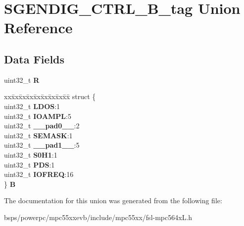 \hypertarget{unionSGENDIG__CTRL__32B__tag}{}\section{S\+G\+E\+N\+D\+I\+G\+\_\+\+C\+T\+R\+L\+\_\+B\+\_\+tag Union Reference}
\label{unionSGENDIG__CTRL__32B__tag}
\subsection*{Data Fields}
\begin{DoxyCompactItemize}
\item 
\mbox{\label{unionSGENDIG__CTRL__32B__tag_a7439266f5eb459218651979318241b4d}} 
uint32\+\_\+t {\bfseries R}
\item 
\mbox{\label{unionSGENDIG__CTRL__32B__tag_a00ea9b8df1abccc253916c457115df25}} 
\begin{tabbing}
xx\=xx\=xx\=xx\=xx\=xx\=xx\=xx\=xx\=\kill
struct \{\\
\>uint32\_t {\bfseries LDOS}:1\\
\>uint32\_t {\bfseries IOAMPL}:5\\
\>uint32\_t {\bfseries \_\_pad0\_\_}:2\\
\>uint32\_t {\bfseries SEMASK}:1\\
\>uint32\_t {\bfseries \_\_pad1\_\_}:5\\
\>uint32\_t {\bfseries S0H1}:1\\
\>uint32\_t {\bfseries PDS}:1\\
\>uint32\_t {\bfseries IOFREQ}:16\\
\} {\bfseries B}\\

\end{tabbing}\end{DoxyCompactItemize}


The documentation for this union was generated from the following file\+:\begin{DoxyCompactItemize}
\item 
bsps/powerpc/mpc55xxevb/include/mpc55xx/fsl-\/mpc564x\+L.\+h\end{DoxyCompactItemize}
